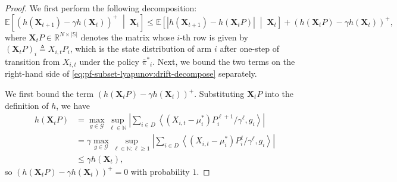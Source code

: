 \documentclass{article}
\theoremstyle{plain}
\theoremstyle{remark}
\newcommand{\givenmiddle}{\;\middle|\;}
\newcommand{\R}{\mathbb{R}}
\newcommand{\abs}[1]{\left\lvert#1\right\rvert}
\newcommand{\sspa}{\mathbb{S}}
\newcommand{\supell}{\sup_{\ell\in\mathbb{N}}}
\newcommand{\pibar}{{\sysbar{\pi}}}
\newcommand{\pibs}{{\pibar^*}}
\newcommand{\sysbar}[1]{\bar{#1}}
\newcommand{\cardS}{\lvert\sspa\rvert}
\def\mX{{\bm{X}}}
\newcommand{\EE}{\mathbb{E}}
\newcommand{\innerproduct}[2]{\left\langle #1, #2 \right\rangle}
\newcommand{\bracket}[1]{\left(#1\right)}
\newcommand{\mbracket}[1]{\left[#1\right]}
\begin{document}
\begin{proof}
We first perform the following decomposition: 
\begin{equation}
    \label{eq:pf-subset-lyapunov:drift-decompose}
    \EE\mbracket{\bracket{h(\mX_{t+1})-\gamma h(\mX_t)}^+\givenmiddle\mX_t} \leq \EE\mbracket{\abs{h(\mX_{t+1})-h(\mX_tP)}\givenmiddle\mX_t} + \bracket{h(\mX_tP)-\gamma h(\mX_t)}^+,
\end{equation}
where $\mX_t P \in \R^{N\times \cardS}$ denotes the matrix whose $i$-th row is given by $(\mX_t P)_i \triangleq X_{i,t}P_i$, which is the state distribution of arm $i$ after one-step of transition from $X_{i,t}$ under the policy $\pibs_i$. 
Next, we bound the two terms on the right-hand side of \eqref{eq:pf-subset-lyapunov:drift-decompose} separately. 


We first bound the term $\bracket{h(\mX_tP)-\gamma h(\mX_t)}^+$. Substituting $\mX_t P$ into the definition of $h$, we have
\begin{align}
    \nonumber
    h(\mX_tP) &= \max_{g\in \mathcal{G}}  \supell \abs{\sum_{i\in D} \innerproduct{(X_{i,t}-\mu_i^*)P_i^{\ell+1}/\gamma^{\ell}}{g_i}}\\
    \nonumber
    &=\gamma \max_{g\in \mathcal{G}}  \sup_{\ell\in\mathbb{N}\colon \ell \geq 1}  \abs{\sum_{i\in D} \innerproduct{(X_{i,t}-\mu_i^*)P_i^{\ell}/\gamma^{\ell}}{g_i}}\\
    \label{eq:h-contraction}
    &\leq \gamma h(\mX_t),
\end{align}
so $\bracket{h(\mX_tP)-\gamma h(\mX_t)}^+ = 0$ with probability $1$. 


\end{proof}
\end{document}
